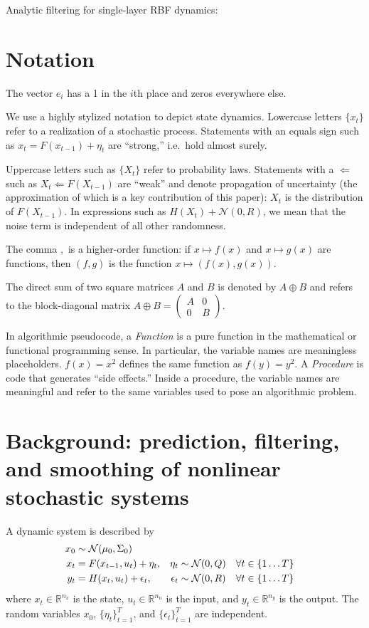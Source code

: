 \documentclass[oneside, article]{memoir}
\begin{document}
Analytic filtering for single-layer RBF dynamics:
\cite{deisenroth_analytic_2009}

\chapter{Notation}
The vector \(e_i\) has a 1 in the \(i\)th place and zeros everywhere else.

We use a highly stylized notation to depict state dynamics.
Lowercase letters \(\{x_t\}\) refer to a realization of a stochastic process.
Statements with an equals sign such as \(x_{t} = F(x_{t-1}) +
\eta_t\) are ``strong,'' i.e.~hold almost surely.

Uppercase letters such as \(\{X_t\}\) refer to probability laws.
Statements with a \(\Longleftarrow\) such as \(X_t \Longleftarrow
F(X_{t-1})\) are ``weak'' and denote propagation of uncertainty (the
approximation of which is a key contribution of this paper): \(X_t\)
is the distribution of \(F(X_{t-1})\).
In expressions such as \(H(X_t) + \mathcal N(0, R)\), we mean that
the noise term is independent of all other randomness.

The comma \(,\) is a higher-order function:
if \(x \mapsto f(x)\) and \(x \mapsto g(x)\) are functions, then \((f
, g)\) is the function \(x \mapsto (f(x), g(x))\).

The direct sum of two square matrices \(A\) and \(B\) is denoted by
\(A \oplus B\) and refers to the block-diagonal matrix \(A \oplus B =
  \begin{pmatrix} A & 0 \\ 0 & B
\end{pmatrix}\).

In algorithmic pseudocode, a \emph{Function} is a pure function in
the mathematical or functional
programming sense.
In particular, the variable names are meaningless placeholders.
\(f(x) = x^2\) defines the same function as \(f(y) = y^2\).
A \emph{Procedure} is code that generates ``side effects.''
Inside a procedure, the variable names are meaningful and refer to
the same variables used to pose an algorithmic problem.

\chapter{Background: prediction, filtering, and smoothing of
nonlinear stochastic systems}
A dynamic system is described by
\begin{subequations}
  \label{eq:dynamic-system}
  \begin{align}
    x_0 &\sim \mathcal{N}(\mu_0, \Sigma_0) \\
    x_t &= F(x_{t-1}, u_t) + \eta_t, &\eta_t &\sim \mathcal{N}(0, Q)
    & \forall t &\in \cbr{1 \ldots T}\\
    y_t &= H(x_t, u_t) + \epsilon_t, &\epsilon_t &\sim \mathcal{N}(0,
    R) & \forall t &\in \cbr{1 \ldots T}
  \end{align}
\end{subequations}
where \(x_t \in \mathbb{R}^{n_x}\) is the state, \(u_t \in \mathbb
R^{n_u}\) is the input, and \(y_t \in \mathbb{R}^{n_y}\) is the output.
The random variables \(x_0\), \(\{\eta_t\}_{t=1}^T\), and
\(\{\epsilon_t\}_{t=1}^T\) are independent.
\end{document}
